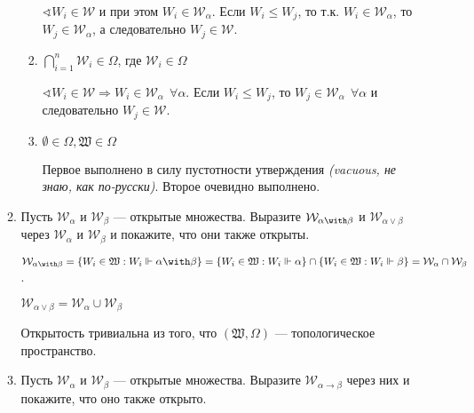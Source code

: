 \begin{enumerate}[wide, labelwidth=!, labelindent=0pt]
\begin{enumerate}
\begin{enumerate}
                                    \(\sphericalangle W_i \in \mathcal{W}\) и при этом \(W_i\in \mathcal{W}_\alpha\). Если \(W_i \leq W_j\), то т.к. \(W_i \in \mathcal{W}_\alpha\), то \(W_j \in \mathcal{W}_\alpha\), а следовательно \(W_j \in \mathcal{W}\).

                              \item \(\bigcap_{i = 1}^{n} \mathcal{W}_i \in \Omega\), где \(\mathcal{W}_i \in\Omega\)

                                    \(\sphericalangle W_i \in \mathcal{W} \Rightarrow W_i \in \mathcal{W}_\alpha \ \ \forall \alpha\). Если \(W_i \leq W_j\), то \(W_j \in \mathcal{W}_\alpha \ \ \forall \alpha\) и следовательно \(W_j \in \mathcal{W}\).

                              \item \(\emptyset\in\Omega, \mathfrak{W}\in \Omega\)

                                    Первое выполнено в силу пустотности утверждения \textit{(vacuous, не знаю, как по-русски)}. Второе очевидно выполнено.
                        \end{enumerate}

                  \item Пусть $\mathcal{W}_\alpha$ и $\mathcal{W}_\beta$ --- открытые множества. Выразите $\mathcal{W}_{\alpha\with\beta}$ и $\mathcal{W}_{\alpha\vee\beta}$
                        через $\mathcal{W}_\alpha$ и $\mathcal{W}_\beta$ и покажите, что они также открыты.

                        \(\mathcal{W}_{\alpha \with \beta} = \{W_i \in \mathfrak{W} : W_i \Vdash \alpha \with \beta\} = \{W_i \in \mathfrak{W} : W_i \Vdash \alpha\} \cap \{W_i \in \mathfrak{W} : W_i \Vdash \beta\} = \mathcal{W}_\alpha \cap \mathcal{W}_\beta\).

                        \(\mathcal{W}_{\alpha \lor \beta} = \mathcal{W}_\alpha \cup \mathcal{W}_\beta\)

                        Открытость тривиальна из того, что \((\mathfrak{W}, \Omega)\) --- топологическое пространство.

                  \item Пусть $\mathcal{W}_\alpha$ и $\mathcal{W}_\beta$ --- открытые множества. Выразите $\mathcal{W}_{\alpha\rightarrow\beta}$ через
                        них и покажите, что оно также открыто.



\end{enumerate}
\end{enumerate}

